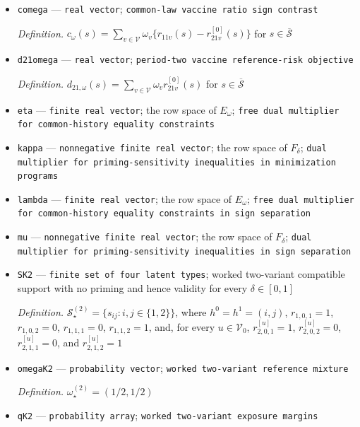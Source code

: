 \documentclass{article}
\begin{document}
\begin{itemize}
  \item \texttt{comega} --- \texttt{real vector}; \texttt{common-\allowbreak{}law vaccine ratio sign contrast}
  \par\smallskip\noindent\emph{Definition.} \(c_\omega(s)=\sum_{v\in\mathcal V}\omega_v\{r_{11v}(s)-r^{[0]}_{21v}(s)\}\) for \(s\in\overline{\mathcal S}\)
  \item \texttt{d21omega} --- \texttt{real vector}; \texttt{period-\allowbreak{}two vaccine reference-\allowbreak{}risk objective}
  \par\smallskip\noindent\emph{Definition.} \(d_{21,\omega}(s)=\sum_{v\in\mathcal V}\omega_vr^{[0]}_{21v}(s)\) for \(s\in\overline{\mathcal S}\)
  \item \texttt{eta} --- \texttt{finite real vector}; the row space of \(E_\omega\); \texttt{free dual multiplier for common-\allowbreak{}history equality constraints}
  \item \texttt{kappa} --- \texttt{nonnegative finite real vector}; the row space of \(F_\delta\); \texttt{dual multiplier for priming-\allowbreak{}sensitivity inequalities in minimization programs}
  \item \texttt{lambda} --- \texttt{finite real vector}; the row space of \(E_\omega\); \texttt{free dual multiplier for common-\allowbreak{}history equality constraints in sign separation}
  \item \texttt{mu} --- \texttt{nonnegative finite real vector}; the row space of \(F_\delta\); \texttt{dual multiplier for priming-\allowbreak{}sensitivity inequalities in sign separation}
  \item \texttt{SK2} --- \texttt{finite set of four latent types}; worked two-variant compatible support with no priming and hence validity for every \(\delta\in[0,1]\)
  \par\smallskip\noindent\emph{Definition.} \(\mathcal S_\star^{(2)}=\{s_{ij}:i,j\in\{1,2\}\}\), where \(h^0=h^1=(i,j)\), \(r_{1,0,1}=1\), \(r_{1,0,2}=0\), \(r_{1,1,1}=0\), \(r_{1,1,2}=1\), and, for every \(u\in\mathcal V_0\), \(r^{[u]}_{2,0,1}=1\), \(r^{[u]}_{2,0,2}=0\), \(r^{[u]}_{2,1,1}=0\), and \(r^{[u]}_{2,1,2}=1\)
  \item \texttt{omegaK2} --- \texttt{probability vector}; \texttt{worked two-\allowbreak{}variant reference mixture}
  \par\smallskip\noindent\emph{Definition.} \(\omega_\star^{(2)}=(1/2,1/2)\)
  \item \texttt{qK2} --- \texttt{probability array}; \texttt{worked two-\allowbreak{}variant exposure margins}

\end{itemize}
\end{document}
